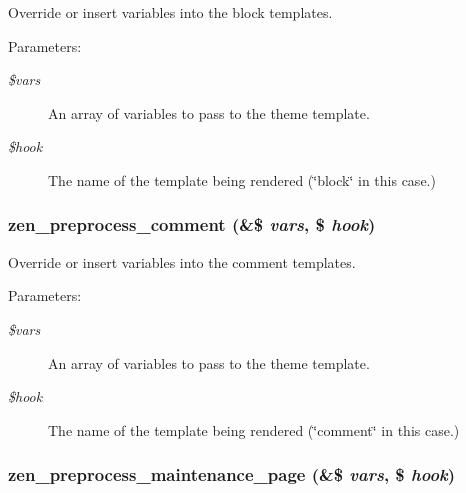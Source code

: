 Override or insert variables into the block templates.

\begin{Desc}
\item[Parameters:]
\begin{description}
\item[{\em \$vars}]An array of variables to pass to the theme template. \item[{\em \$hook}]The name of the template being rendered (\char`\"{}block\char`\"{} in this case.) \end{description}
\end{Desc}
\hypertarget{sites_2all_2themes_2zen_2template_8php_e3144098bb1a4d10b5c4b2deaf08afe7}{
\subsubsection[{zen\_\-preprocess\_\-comment}]{\setlength{\rightskip}{0pt plus 5cm}zen\_\-preprocess\_\-comment (\&\$ {\em vars}, \/  \$ {\em hook})}}
\label{sites_2all_2themes_2zen_2template_8php_e3144098bb1a4d10b5c4b2deaf08afe7}


Override or insert variables into the comment templates.

\begin{Desc}
\item[Parameters:]
\begin{description}
\item[{\em \$vars}]An array of variables to pass to the theme template. \item[{\em \$hook}]The name of the template being rendered (\char`\"{}comment\char`\"{} in this case.) \end{description}
\end{Desc}
\hypertarget{sites_2all_2themes_2zen_2template_8php_b10127f1877ff315fa0dc19019c9cd77}{
\subsubsection[{zen\_\-preprocess\_\-maintenance\_\-page}]{\setlength{\rightskip}{0pt plus 5cm}zen\_\-preprocess\_\-maintenance\_\-page (\&\$ {\em vars}, \/  \$ {\em hook})}}
\label{sites_2all_2themes_2zen_2template_8php_b10127f1877ff315fa0dc19019c9cd77}


